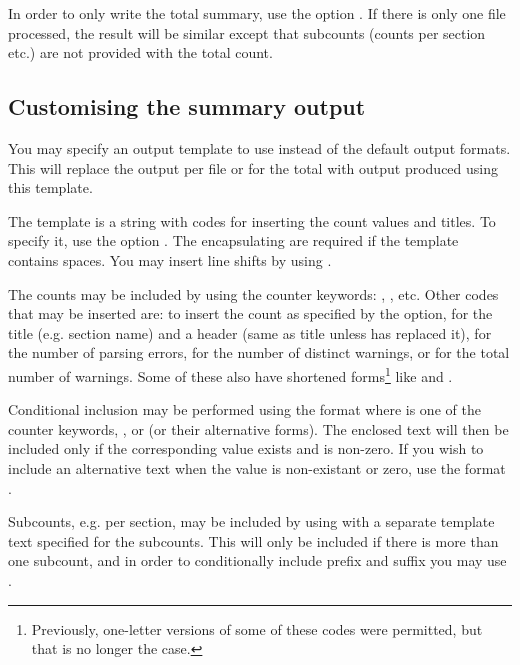 \documentclass{article}
\begin{document}
In order to only write the total summary, use the option . If there is only one file processed, the result will be similar except that subcounts (counts per section etc.) are not provided with the total count.


\subsection{Customising the summary output}

You may specify an output template to use instead of the default output formats. This will replace the output per file or for the total with output produced using this template.

The template is a string with codes for inserting the count values and titles. To specify it, use the option . The encapsulating  are required if the template contains spaces. You may insert line shifts by using .

The counts may be included by using the counter keywords: , , etc. Other codes that may be inserted are:  to insert the count as specified by the  option,  for the title (e.g. section name) and a header (same as title unless \TeXcount{} has replaced it),  for the number of parsing errors,  for the number of distinct warnings, or  for the total number of warnings. Some of these also have shortened forms\footnote{Previously, one-letter versions of some of these codes were permitted, but that is no longer the case.} like  and .

Conditional inclusion may be performed using the format  where  is one of the counter keywords, ,  or  (or their alternative forms). The enclosed text will then be included only if the corresponding value exists and is non-zero. If you wish to include an alternative text when the value is non-existant or zero, use the format .

Subcounts, e.g. per section, may be included by using  with a separate template text specified for the subcounts. This will only be included if there is more than one subcount, and in order to conditionally include prefix and suffix you may use .
\end{document}

